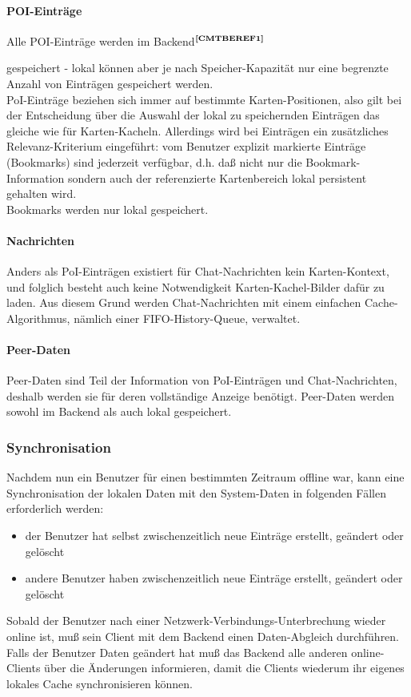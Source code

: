 \paragraph{POI-Einträge}
Alle POI-Einträge werden im Backend$^{\textbf{\ref{CMTBEREF1}}}$%
\addtocounter{footnote}{1}%
 gespeichert - lokal können aber je nach Speicher-Kapazität nur eine begrenzte Anzahl von Einträgen gespeichert werden.\\ PoI-Einträge beziehen sich immer auf bestimmte Karten-Positionen, also gilt bei der Entscheidung über die Auswahl der lokal zu speichernden Einträgen das gleiche wie für Karten-Kacheln.
Allerdings wird bei Einträgen ein zusätzliches Relevanz-Kriterium eingeführt: vom Benutzer explizit markierte Einträge (Bookmarks) sind jederzeit verfügbar, d.h. daß nicht nur die Bookmark-Information sondern auch der referenzierte Kartenbereich lokal persistent gehalten wird.\\
Bookmarks werden nur lokal gespeichert.

\paragraph{Nachrichten}
Anders als PoI-Einträgen existiert für Chat-Nachrichten kein Karten-Kontext, und folglich besteht auch keine Notwendigkeit Karten-Kachel-Bilder dafür zu laden. Aus diesem Grund werden
Chat-Nachrichten mit einem einfachen Cache-Algorithmus, nämlich einer FIFO-History-Queue, verwaltet.

\paragraph{Peer-Daten}
Peer-Daten sind Teil der Information von PoI-Einträgen und Chat-Nachrichten, deshalb werden sie für deren vollständige Anzeige benötigt. Peer-Daten werden sowohl im Backend als auch lokal gespeichert.

\subsubsection{Synchronisation}
Nachdem nun ein Benutzer für einen bestimmten Zeitraum offline war, kann eine Synchronisation
der lokalen Daten mit den System-Daten in folgenden Fällen erforderlich werden:
	\begin{itemize}
		\item der Benutzer hat selbst zwischenzeitlich neue Einträge erstellt, geändert oder gelöscht
		\item andere Benutzer haben zwischenzeitlich neue Einträge erstellt, geändert oder gelöscht
	\end{itemize}
Sobald der Benutzer nach einer Netzwerk-Verbindungs-Unterbrechung wieder online ist, muß sein Client mit dem Backend einen Daten-Abgleich durchführen. Falls der Benutzer Daten geändert hat muß das Backend alle anderen online-Clients über die Änderungen informieren, damit die Clients wiederum ihr eigenes lokales Cache synchronisieren können.





